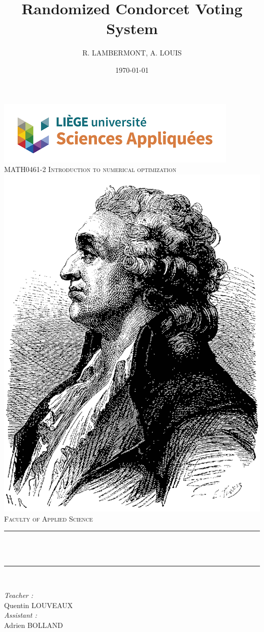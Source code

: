 \title{Randomized Condorcet Voting System}								%
\author{R. LAMBERMONT, A. LOUIS}								%
\date{\today}											%

\makeatletter
\let\thetitle\@title
\let\theauthor\@author
\let\thedate\@date
\makeatother

\pagestyle{fancy}
\fancyhf{}
\rhead{\theauthor}
\lhead{\thetitle}
\cfoot{\thepage}

\begin{titlepage}
 \centering
 \vspace*{0.5 cm}
 \includegraphics[scale = 0.7]{figs/facsa.png}\\[1.0 cm]	%
 \textsc{\Large MATH0461-2 Introduction to numerical optimization}\\[1.5 cm]	%
 \includegraphics*[width=.2\textwidth]{figs/condorcet.png}\\[1.5 cm]
 \textsc{\LARGE \newline\newline Faculty of Applied Science}\\[0.5 cm]				%
 \rule{\linewidth}{0.2 mm} \\[0.4 cm]
 {\huge \bfseries \thetitle}\\
 \rule{\linewidth}{0.2 mm} \\[1.5 cm]

 \begin{minipage}{0.5\textwidth}
 	\begin{flushleft} \large
 		\emph{Teacher :}\\
 		Quentin LOUVEAUX\\
    \vspace{0.5cm}
    \emph{Assistant :}\\
    Adrien BOLLAND\\
 		\end{flushleft}
 		\end{minipage}~
 		\begin{minipage}{0.4\textwidth}


\end{minipage}
\end{titlepage}
